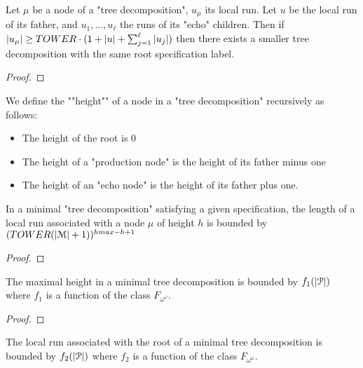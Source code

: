 \begin{lemma}
	Let $\mu$ be a node of a "tree decomposition", $u_\mu$ its local run.
	Let $u$ be the local run of its father, and $u_1, \ldots, u_\ell$ the runs of its "echo" children.
	Then if $|u_\mu| \geq TOWER \cdot (1+ |u|+ \sum_{j=1}^{\ell} |u_j|)$ then there exists a smaller tree decomposition with the same root specification label.
\end{lemma}

\begin{proof}
\end{proof}

\begin{definition}
	We define the ""height"" of a node in a "tree decomposition" recursively as follows:
	\begin{itemize}
		\item The height of the root is $0$
		
		\item The height of a "production node" is the height of its father minus one
		
		\item The height of an "echo node" is the height of its father plus one.
	\end{itemize}
\end{definition}

\begin{lemma}
	\label{lem:bound-length-at-height-h}
	In a minimal "tree decomposition" satisfying a given specification, the length of a local run associated with a node $\mu$ of height $h$ is bounded by $(TOWER (|\mathcal{M}|+1))^{hmax-h+1}$
\end{lemma}

\begin{proof}
\end{proof}

\begin{lemma}
	\label{lem:bound-max-height}
	The maximal height in a minimal tree decomposition is bounded by $f_1(|\mathcal{P}|)$ where $f_1$ is a function of the class $F_{\omega^\omega}$.
\end{lemma}

\begin{proof}
\end{proof}

\begin{corollary}
	The local run associated with the root of a minimal tree decomposition is bounded by $f_2(|\mathcal{P}|)$ where $f_2$ is a function of the class $F_{\omega^\omega}$.
\end{corollary}

